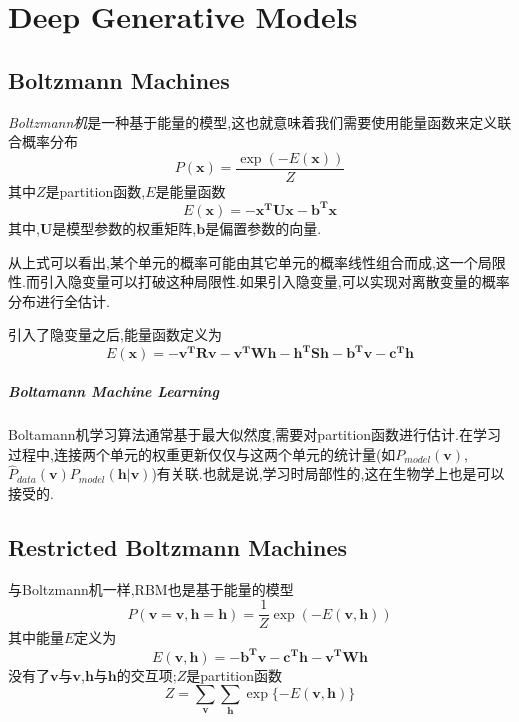 \chapter{Deep Generative Models}

\section{Boltzmann Machines}

\textit{Boltzmann机}是一种基于能量的模型,这也就意味着我们需要使用能量函数来定义联合概率分布
\begin{equation}
P(\bm x)=\frac{\exp(-E(\bm x))}{Z}
\end{equation}
其中$Z$是partition函数,$E$是能量函数
\begin{equation}
E(\bm x)=\bm{-x^TUx-b^Tx}
\end{equation}
其中,$\bm U$是模型参数的权重矩阵,$\bm b$是偏置参数的向量.

从上式可以看出,某个单元的概率可能由其它单元的概率线性组合而成,这一个局限性.而引入隐变量可以打破这种局限性.如果引入隐变量,可以实现对离散变量的概率分布进行全估计.

引入了隐变量之后,能量函数定义为
\begin{equation}
E(\bm x)=\bm{-v^TRv-v^TWh-h^TSh-b^Tv-c^Th}
\end{equation}

\paragraph{Boltamann Machine Learning} Boltamann机学习算法通常基于最大似然度,需要对partition函数进行估计.在学习过程中,连接两个单元的权重更新仅仅与这两个单元的统计量(如$P_{model}(\bm v)$,$\hat P_{data}(\bm v)P_{model}(\bm{h|v})$)有关联.也就是说,学习时局部性的,这在生物学上也是可以接受的.

\section{Restricted Boltzmann Machines}

与Boltzmann机一样,RBM也是基于能量的模型
\begin{equation}
P(\mathbf v=\bm v,\mathbf h=\bm h)=\frac{1}{Z}\exp(-E(\bm{v,h}))
\end{equation}
其中能量$E$定义为
\begin{equation}
E(\bm{v,h})=\bm{-b^Tv-c^Th-v^TWh}
\end{equation}
没有了$\bm v$与$\bm v$,$\bm h$与$\bm h$的交互项;$Z$是partition函数
\begin{equation}
Z=\sum_{\bm v}\sum_{\bm h}\exp\{-E(\bm{v,h})\}
\end{equation}

